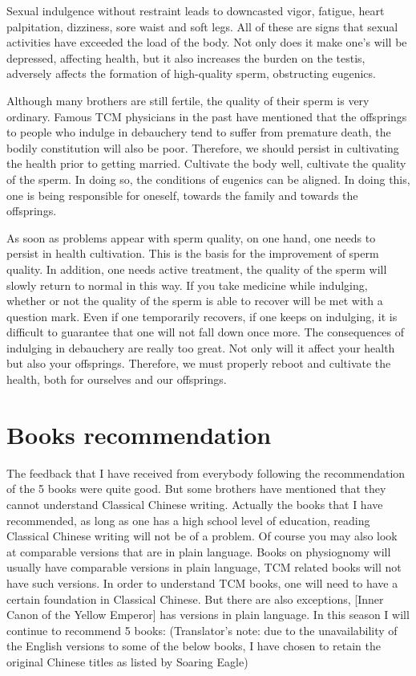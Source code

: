 \documentclass[
]{book}
\begin{document}
Sexual indulgence without restraint leads to downcasted vigor, fatigue, heart palpitation, dizziness, sore waist and soft legs. All of these are signs that sexual activities have exceeded the load of the body. Not only does it make one's will be depressed, affecting health, but it also increases the burden on the testis, adversely affects the formation of high-quality sperm, obstructing eugenics.

Although many brothers are still fertile, the quality of their sperm is very ordinary. Famous TCM physicians in the past have mentioned that the offsprings to people who indulge in debauchery tend to suffer from premature death, the bodily constitution will also be poor. Therefore, we should persist in cultivating the health prior to getting married. Cultivate the body well, cultivate the quality of the sperm. In doing so, the conditions of eugenics can be aligned. In doing this, one is being responsible for oneself, towards the family and towards the offsprings.

As soon as problems appear with sperm quality, on one hand, one needs to persist in health cultivation. This is the basis for the improvement of sperm quality. In addition, one needs active treatment, the quality of the sperm will slowly return to normal in this way. If you take medicine while indulging, whether or not the quality of the sperm is able to recover will be met with a question mark. Even if one temporarily recovers, if one keeps on indulging, it is difficult to guarantee that one will not fall down once more. The consequences of indulging in debauchery are really too great. Not only will it affect your health but also your offsprings. Therefore, we must properly reboot and cultivate the health, both for ourselves and our offsprings.

\hypertarget{books-recommendation-1}{%
\section{Books recommendation}\label{books-recommendation-1}}

The feedback that I have received from everybody following the recommendation of the 5 books were quite good. But some brothers have mentioned that they cannot understand Classical Chinese writing. Actually the books that I have recommended, as long as one has a high school level of education, reading Classical Chinese writing will not be of a problem. Of course you may also look at comparable versions that are in plain language. Books on physiognomy will usually have comparable versions in plain language, TCM related books will not have such versions. In order to understand TCM books, one will need to have a certain foundation in Classical Chinese. But there are also exceptions, {[}Inner Canon of the Yellow Emperor{]} has versions in plain language. In this season I will continue to recommend 5 books: (Translator's note: due to the unavailability of the English versions to some of the below books, I have chosen to retain the original Chinese titles as listed by Soaring Eagle)
\end{document}
